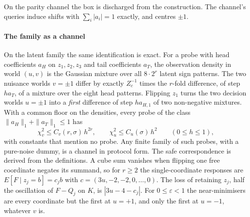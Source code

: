 On the parity channel the box is discharged from the construction. The channel's queries
induce shifts with $\sum_{i}|a_{i}|=1$ exactly, and centres $\pm1$.


\paragraph{The family as a channel} On the latent family the same identification is exact. For
a probe with head coefficients $a_{H}$ on $z_{1},z_{2},z_{3}$ and tail coefficients $a_{T}$, the
observation density in world $(u,v)$ is the Gaussian mixture over all $8\cdot2^{r}$ latent sign
patterns. The two nuisance worlds $v=\pm1$ differ by exactly
$Z_{c}^{-1}$ times the $r$-fold difference, of step $ha_{T}$, of a mixture over the eight head
patterns. Flipping $z_{1}$ turns the two decision worlds $u=\pm1$ into a \emph{first}
difference of step $h a_{H,1}$ of two non-negative mixtures. With a common floor on the
densities, every probe of the class $\|a_{H}\|_{1}+\|a_{T}\|_{1}\le1$ has
\[
\chi^{2}_{v}\le C_{v}(r,\sigma)\,h^{2r},\qquad \chi^{2}_{u}\le C_{u}(\sigma)\,h^{2}
\qquad(0\le h\le1),
\]
with constants that mention no probe. Any finite family of such probes, with a pure-noise dummy,
is a channel in protocol form. The safe correspondence is derived from the definitions. A cube
sum vanishes when flipping one free coordinate negates its summand, so for $r\ge2$ the
single-coordinate responses are $E[F\mid z_{j}=b]=c_{j}b$ with $c=(3u,-2,-2,0,\dots,0)$. The loss of
retaining $z_{j}$, half the oscillation of $F-Q_{j}$ on $K$, is $|3u-4-c_{j}|$. For
$0\le\varepsilon<1$ the near-minimisers are every coordinate but the first at $u=+1$, and only the
first at $u=-1$, whatever $v$ is.


